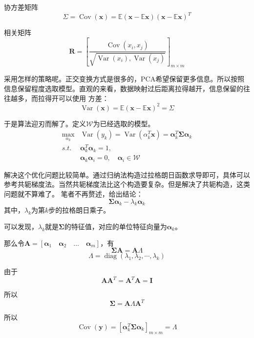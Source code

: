 \documentclass{article}
\begin{document}
    协方差矩阵
    \[\Sigma=\operatorname{Cov}(\boldsymbol{x})=\mathbb{E}(\boldsymbol{x}-\mathbb{E}\boldsymbol{x})(\boldsymbol{x}-\mathbb{E}\boldsymbol{x})^T\]


    相关矩阵
    \[\boldsymbol{R}=\left[\frac{\operatorname{Cov}(x_i,x_j)}{\sqrt{\operatorname{Var}(x_i),\operatorname{Var}(x_j)}}\right]_{m\times m}\]

    采用怎样的策略呢。正交变换方式是很多的，PCA希望保留更多信息。所以按照信息保留程度选取模型。直观的来看，数据映射过后距离拉得越开，信息保留的往往越多，而拉得开可以使用
    方差：
    \[\operatorname{Var}(\boldsymbol{x})=\mathbb{E}(\boldsymbol{x}-\mathbb{E}\boldsymbol{x})^2=\Sigma\]
    
    于是算法迎刃而解了。定义$\mathcal{W}$为已经选取的模型。
    \begin{align*}
        \max_{\alpha_k} &\operatorname{Var}(y_k)=\operatorname{Var}(\alpha_k^T\boldsymbol{x})=\boldsymbol{\alpha}_k^T\boldsymbol{\Sigma}\boldsymbol{\alpha}_k\\
        s.t. &\boldsymbol{\alpha}_k^T\boldsymbol{\alpha}_k=1,\\
        &\boldsymbol{\alpha}_k\boldsymbol{\alpha}_i=0,\quad \boldsymbol{\alpha}_i\in \mathcal{W}
    \end{align*}

    解决这个优化问题比较简单。通过归纳法构造过拉格朗日函数求导即可，具体可以参考共轭梯度法。当然共轭梯度法比这个构造要复杂。但是解决了共轭构造，这类问题就不算难了。
    笔者不再赘述，给出结论：
    \[\boldsymbol{\Sigma}\boldsymbol{\alpha}_k-\lambda_k\boldsymbol{\alpha}_k\]
    其中，$\lambda_k$为第$k$步的拉格朗日乘子。

    可以发现，$\lambda_k$就是$\boldsymbol{\Sigma}$的特征值，对应的单位特征向量为$\boldsymbol{\alpha}_k$。

    那么令$\boldsymbol{A}=[\boldsymbol{\alpha}_1\quad\boldsymbol{\alpha}_2\quad\dots\quad \boldsymbol{\alpha}_m]$，有
    \[\boldsymbol{\Sigma}\boldsymbol{A}=\boldsymbol{A}\boldsymbol{\varLambda }\]
    \[\boldsymbol{\varLambda }=\operatorname{diag}(\lambda_1,\lambda_2,\cdots,\lambda_k)\]

    由于
    \[\boldsymbol{A}\boldsymbol{A}^T=\boldsymbol{A}^T\boldsymbol{A}=\boldsymbol{I}\]

    所以
    \[\boldsymbol{\Sigma}=\boldsymbol{A}\boldsymbol{\varLambda }\boldsymbol{A}^T\]

    所以
    \[\operatorname{Cov}(\boldsymbol{y})=[\boldsymbol{\alpha}_k^T\boldsymbol{\Sigma}\boldsymbol{\alpha}_k]_{m\times m}=\boldsymbol{\varLambda }\]
\end{document}
